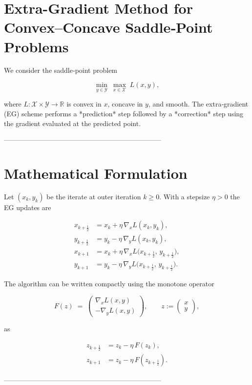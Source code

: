 \documentclass{article}
\newcommand{\RR}{\mathbb{R}}
\begin{document}
\section*{Extra-Gradient Method for Convex--Concave Saddle‑Point Problems}
We consider the saddle‑point problem  

\[
\min_{y\in\mathcal{Y}}\;\max_{x\in\mathcal{X}} \;L(x,y),
\]

where $L:\mathcal{X}\times\mathcal{Y}\rightarrow\RR$ is convex in $x$, concave in $y$, and smooth.  
The extra‑gradient (EG) scheme performs a *prediction* step followed by a *correction* step using the gradient evaluated at the predicted point.

---------------------------------------------------------------------

\section*{Mathematical Formulation}
Let $(x_k,y_k)$ be the iterate at outer iteration $k\ge 0$.  
With a stepsize $\eta>0$ the EG updates are

\[
\begin{aligned}
x_{k+\frac12}&=x_k+\eta\,\nabla_x L(x_k,y_k),\\[0.2em]
y_{k+\frac12}&=y_k-\eta\,\nabla_y L(x_k,y_k),\\[0.5em]
x_{k+1}&=x_k+\eta\,\nabla_x L\!\bigl(x_{k+\frac12},\,y_{k+\frac12}\bigr),\\[0.2em]
y_{k+1}&=y_k-\eta\,\nabla_y L\!\bigl(x_{k+\frac12},\,y_{k+\frac12}\bigr).
\end{aligned}
\tag{EG}
\]

The algorithm can be written compactly using the monotone operator  

\[
F(z)\;=\;\begin{pmatrix}
\nabla_x L(x,y)\\[0.2em]
-\nabla_y L(x,y)
\end{pmatrix},
\qquad z:=\begin{pmatrix}x\\y\end{pmatrix},
\]

as  

\[
\begin{aligned}
z_{k+\frac12}&=z_k-\eta\,F(z_k),\\
z_{k+1}&=z_k-\eta\,F(z_{k+\frac12}).
\end{aligned}
\tag{1}
\]

---------------------------------------------------------------------
\end{document}

